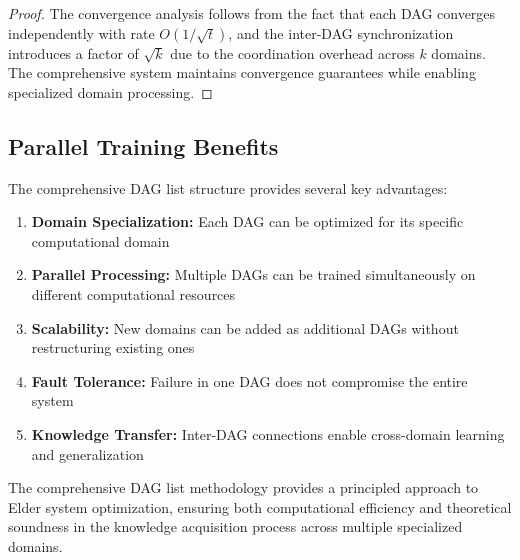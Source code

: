 \begin{proof}
The convergence analysis follows from the fact that each DAG converges independently with rate $O(1/\sqrt{t})$, and the inter-DAG synchronization introduces a factor of $\sqrt{k}$ due to the coordination overhead across $k$ domains. The comprehensive system maintains convergence guarantees while enabling specialized domain processing.
\end{proof}

\subsection{Parallel Training Benefits}

The comprehensive DAG list structure provides several key advantages:

\begin{enumerate}
    \item \textbf{Domain Specialization:} Each DAG can be optimized for its specific computational domain
    \item \textbf{Parallel Processing:} Multiple DAGs can be trained simultaneously on different computational resources
    \item \textbf{Scalability:} New domains can be added as additional DAGs without restructuring existing ones
    \item \textbf{Fault Tolerance:} Failure in one DAG does not compromise the entire system
    \item \textbf{Knowledge Transfer:} Inter-DAG connections enable cross-domain learning and generalization
\end{enumerate}

The comprehensive DAG list methodology provides a principled approach to Elder system optimization, ensuring both computational efficiency and theoretical soundness in the knowledge acquisition process across multiple specialized domains.